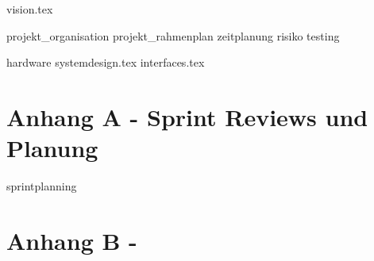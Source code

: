 \documentclass[a4paper, 10pt, fleqn]{article}
\begin{document}
	\begin{titlepage}
		\titleGM
		\thispagestyle{empty}
	\end{titlepage}
	
    
	\tableofcontents
	
    \clearpage
    
	\clearpage
	
    
    {vision.tex}
    
    {projekt_organisation}
    \clearpage
    {projekt_rahmenplan}
    \clearpage
    {zeitplanung}
    \clearpage
    {risiko}
    \clearpage
    {testing}
    
    {hardware}
    \clearpage
	{systemdesign.tex}
    \clearpage
    {interfaces.tex}
    
    \clearpage
    
    
    \clearpage
    \nocite{*}
    
    
    
    \clearpage
    \listoffigures
    \listoftables
    
    \clearpage
   	\section*{Anhang A - Sprint Reviews und Planung}
    {sprintplanning}
    
    \clearpage
    \section*{Anhang B -}
\end{document}
